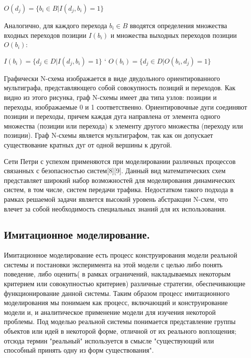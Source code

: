   \begin{center}
    $O(d_{j}) = \{b_{i} \in B|I(d_{j}, b_{i}) = 1\}$
  \end{center}

  Аналогично, для каждого перехода $b_{i} \in B$ вводятся определения множества входных переходов позиции $I(b_{i})$ и множества выходных переходов позиции $O(b_{i})$:

  \begin{center}
    $I(b_{i}) = \{d_{j} \in D|I(d_{j}, b_{i}) = 1 \}$
    `
    $O(b_{i}) = \{d_{j} \in D|O(b_{i}, d_{j}) = 1 \}$
  \end{center}

  Графически N-схема изображается в виде двудольного ориентированного мультиграфа, представляющего собой совокупность позиций и переходов. Как видно из этого рисунка, граф N-схемы имеет два типа узлов: позиции и переходы, изображаемые 0 и 1 соответственно. Ориентировочные дуги соединяют позиции и переходы, причем каждая дуга направлена от элемента одного множества (позиции или перехода) к элементу другого множества (переходу или позиции). Граф N-схемы является мультиграфом, так как он допускает существование кратных дуг от одной вершины к другой.

    Сети Петри с успехом применяются при моделировании различных процессов связанных с безопасностью систем[8][9]. Данный вид математических схем представляет широкий набор возможностей для моделирования динамических систем, в том числе, систем передачи трафика. Недостатком такого подхода в рамках решаемой задачи является высокий уровень абстракции N-схем, что влечет за собой необходимость специальных знаний для их использования.

\subsection{Имитационное моделирование.}

    Имитационное моделирование есть процесс конструирования модели реальной системы и постановки эксперимента на этой модели с целью либо понять поведение, либо оценить( в рамках ограничений, накладываемых некоторым критерием или совокупностью критериев) различные стратегии, обеспечивающие функционирование данной системы. Таким образом процесс имитационного моделирования мы понимаем как процесс, включающий и конструирование модели и, и аналитическое применение модели для изучения некоторой проблемы. Под моделью реальной системы понимается представление группы объектов или идей в некоторой форме, отличной от их реального воплощения; отсюда термин "реальный" используется в смысле "существующий или способный принять одну из форм существования".

